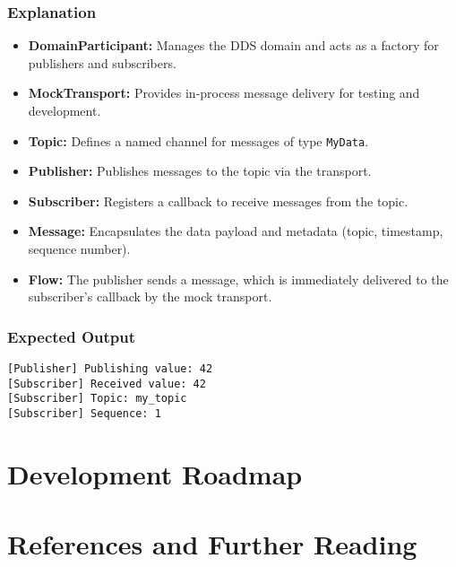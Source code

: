 \documentclass[12pt]{report}
\begin{document}
\subsection{Explanation}
\begin{itemize}
    \item \textbf{DomainParticipant:} Manages the DDS domain and acts as a factory for publishers and subscribers.
    \item \textbf{MockTransport:} Provides in-process message delivery for testing and development.
    \item \textbf{Topic:} Defines a named channel for messages of type \texttt{MyData}.
    \item \textbf{Publisher:} Publishes messages to the topic via the transport.
    \item \textbf{Subscriber:} Registers a callback to receive messages from the topic.
    \item \textbf{Message:} Encapsulates the data payload and metadata (topic, timestamp, sequence number).
    \item \textbf{Flow:} The publisher sends a message, which is immediately delivered to the subscriber's callback by the mock transport.
\end{itemize}

\subsection{Expected Output}
\begin{lstlisting}
[Publisher] Publishing value: 42
[Subscriber] Received value: 42
[Subscriber] Topic: my_topic
[Subscriber] Sequence: 1
\end{lstlisting}

\chapter{Development Roadmap}

\appendix
\chapter{References and Further Reading}
\end{document}
